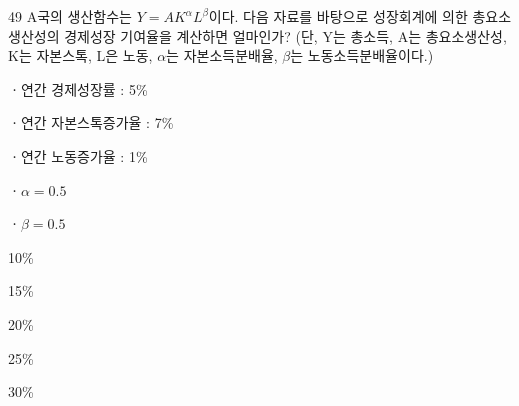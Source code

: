 \begin{question}{49}
A국의 생산함수는 $Y = AK^{\alpha}L^{\beta}$이다. 다음 자료를 바탕으로 성장회계에 의한 총요소생산성의 경제성장 기여율을 계산하면 얼마인가? (단, Y는 총소득, A는 총요소생산성, K는 자본스톡, L은 노동, $\alpha$는 자본소득분배율, $\beta$는 노동소득분배율이다.)
\begin{framedtext}
ㆍ연간 경제성장률 : 5\% \par
ㆍ연간 자본스톡증가율 : 7\% \par
ㆍ연간 노동증가율 : 1\% \par
ㆍ$\alpha = 0.5$ \par
ㆍ$\beta = 0.5$ \par
\end{framedtext}
\begin{choices}
  \item 10\%
  \item 15\%
  \item 20\%
  \item 25\%
  \item 30\%
\end{choices}
\end{question}
